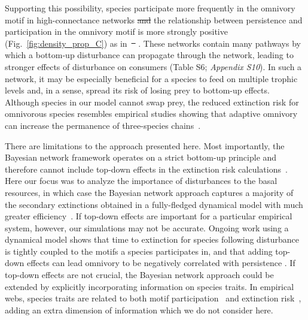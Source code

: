 \documentclass[12pt]{article}
\providecommand{\DIFadd}[1]{{\protect\color{blue}\uwave{#1}}} %
\providecommand{\DIFdel}[1]{{\protect\color{red}\sout{#1}}}                      %
\providecommand{\DIFaddbegin}{} %
\providecommand{\DIFaddend}{} %
\providecommand{\DIFdelbegin}{} %
\providecommand{\DIFdelend}{} %
\newcommand{\DIFscaledelfig}{0.5}
\newlength{\DIFdelgraphicswidth} %
\newlength{\DIFdelgraphicsheight} %
\newcommand{\DIFaddincludegraphics}[2][]{{\color{blue}\fbox{\DIFOincludegraphics[#1]{#2}}}} %
\newcommand{\DIFdelincludegraphics}[2][]{%
\sbox{\DIFdelgraphicsbox}{\DIFOincludegraphics[#1]{#2}}%
\settoboxwidth{\DIFdelgraphicswidth}{\DIFdelgraphicsbox} %
\settoboxtotalheight{\DIFdelgraphicsheight}{\DIFdelgraphicsbox} %
\scalebox{\DIFscaledelfig}{%
\parbox[b]{\DIFdelgraphicswidth}{\usebox{\DIFdelgraphicsbox}\\[-\baselineskip] \rule{\DIFdelgraphicswidth}{0em}}\llap{\resizebox{\DIFdelgraphicswidth}{\DIFdelgraphicsheight}{%
\setlength{\unitlength}{\DIFdelgraphicswidth}%
\begin{picture}(1,1)%
\thicklines\linethickness{2pt} %
{\color[rgb]{1,0,0}\put(0,0){\framebox(1,1){}}}%
{\color[rgb]{1,0,0}\put(0,0){\line( 1,1){1}}}%
{\color[rgb]{1,0,0}\put(0,1){\line(1,-1){1}}}%
\end{picture}%
}\hspace*{3pt}}} %
} %
\DeclareRobustCommand{\DIFaddbegin}{\DIFOaddbegin \let\includegraphics\DIFaddincludegraphics} %
\DeclareRobustCommand{\DIFaddend}{\DIFOaddend \let\includegraphics\DIFOincludegraphics} %
\DeclareRobustCommand{\DIFdelbegin}{\DIFOdelbegin \let\includegraphics\DIFdelincludegraphics} %
\DeclareRobustCommand{\DIFdelend}{\DIFOaddend \let\includegraphics\DIFOincludegraphics} %
\begin{document}
\begin{spacing}{2.0}
    Supporting this possibility, species participate more frequently in the omnivory motif in high-connectance networks \DIFdelbegin \DIFdel{and }\DIFdelend \DIFaddbegin \emph{\DIFadd{and}} \DIFaddend the relationship between persistence and participation in the omnivory motif is more strongly positive (Fig.~\ref{fig:density_prop_C}) as in~\DIFdelbegin \DIFdel{\mbox{%
\citet{McLeod2021}}\hspace{0pt}%
}\DIFdelend \DIFaddbegin \DIFadd{\mbox{%
\citep{McLeod2021}}\hspace{0pt}%
}\DIFaddend .
    These networks contain many pathways by which a bottom-up disturbance can propagate through the network, leading to stronger effects of disturbance on consumers (Table S6; \emph{Appendix S10}).
    In such a network, it may be especially beneficial for a species to feed on multiple trophic levels and, in a sense, spread its risk of losing prey to bottom-up effects.
    Although species in our model cannot swap prey, the reduced extinction risk for omnivorous species resembles empirical studies showing that adaptive omnivory can increase the permanence of three-species chains~\citep{Fagan1997, Kvrivan2005, AbramsFung2010}.

    
    There are limitations to the approach presented here.
    Most importantly, the Bayesian network framework operates on a  strict bottom-up principle and therefore cannot include top-down effects in the extinction risk calculations~\citep{Eklof2013}. 
    Here our focus was to analyze the importance of disturbances to the basal resources, in which case the Bayesian network approach captures a majority of the secondary extinctions obtained in a fully-fledged dynamical model with much greater efficiency~\citep{Eklof2013}.
    If top-down effects are important for a particular empirical system, however, our simulations may not be accurate. 
    Ongoing work using a dynamical model shows that time to extinction for species following disturbance is tightly coupled to the motifs a species participates in, and that adding top-down effects can lead omnivory to be negatively correlated with persistence \citep{Cirtwill2021_inprep}. 
    If top-down effects are not crucial, the Bayesian network approach could be extended by explicitly incorporating information on species traits.
    In empirical webs, species traits are related to both motif participation~\citep{cirtwill2018feeding} and extinction risk~\citep{Brose2017, curtsdotter2011robustness, Cardillo2005, Purvis2000},
    adding an extra dimension of information which we do not consider here.


\end{spacing}
\end{document}
